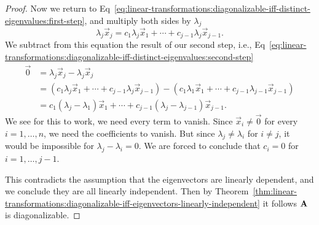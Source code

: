 \begin{proof}
Now we return to Eq~\eqref{eq:linear-transformations:diagonalizable-iff-distinct-eigenvalues:first-step},
and multiply both sides by $\lambda_{j}$
\begin{equation}
\lambda_{j}\vec{x}_{j} = c_{1}\lambda_{j}\vec{x}_{1} + \cdots + c_{j-1}\lambda_{j}\vec{x}_{j-1}.
\end{equation}
We subtract from this equation the result of our second step, i.e., Eq~\eqref{eq:linear-transformations:diagonalizable-iff-distinct-eigenvalues:second-step}
\begin{subequations}
\begin{align}
    \vec{0} &= \lambda_{j}\vec{x}_{j} - \lambda_{j}\vec{x}_{j}\\
    &= (c_{1}\lambda_{j}\vec{x}_{1} + \cdots + c_{j-1}\lambda_{j}\vec{x}_{j-1})
 - (c_{1}\lambda_{1}\vec{x}_{1} + \cdots + c_{j-1}\lambda_{j-1}\vec{x}_{j-1})\\
&= c_{1}(\lambda_{j}-\lambda_{1})\vec{x}_{1} + \cdots + c_{j-1}(\lambda_{j}-\lambda_{j-1})\vec{x}_{j-1}.
\end{align}
\end{subequations}
We see for this to work, we need every term to vanish. Since
$\vec{x}_{i}\neq\vec{0}$ for every $i=1,\dots,n$, we need the
coefficients to vanish. But since $\lambda_{j}\neq\lambda_{i}$ for
$i\neq j$, it would be impossible for $\lambda_{j}-\lambda_{i}=0$. We are
forced to conclude that $c_{i}=0$ for $i=1,\dots,j-1$.

This contradicts the assumption that the eigenvectors are linearly dependent,
and we conclude they are all linearly independent. Then by Theorem~\ref{thm:linear-transformations:diagonalizable-iff-eigenvectors-linearly-independent}
it follows $\mathbf{A}$ is diagonalizable.
\end{proof}

